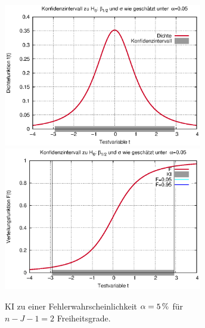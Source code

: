 \documentclass[a4paper]{foils}
\begin{document}
\begin{landscape}
\begin{center}
\newpage
\vspace{2em}

\newpage
\vspace{3em}

\parbox{1.31\textwidth}{
\includegraphics[width=0.65\textwidth]{figsRegr/f_student_KI.eps}
\includegraphics[width=0.65\textwidth]{figsRegr/F_student_KI.eps}
}
\vspace{2em}

\parbox{1.0\textwidth}{KI zu einer Fehlerwahrscheinlichkeit
  $\alpha=\unit[5]{\%}$ f\"ur\\ $n-J-1=2$ 
Freiheitsgrade.}

\newpage

\vspace{0.8em}


\end{center}
\end{landscape}
\end{document}

